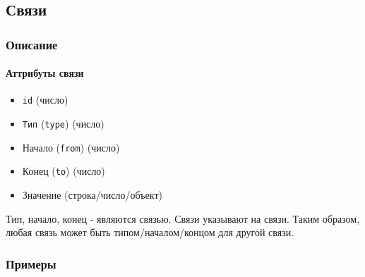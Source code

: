 \subsection{Связи}

\subsubsection{Описание}

\paragraph{Аттрибуты связи}

\begin{itemize}
      \item \texttt{id} (число)
      \item \texttt{Тип} (\texttt{type}) (число)
      \item Начало (\texttt{from}) (число)
      \item Конец (\texttt{to}) (число)
      \item Значение (строка/число/объект)
\end{itemize}

Тип, начало, конец - являются связью. Связи указывают на связи. Таким образом,
любая связь может быть типом/началом/концом для другой связи.

\subsubsection{Примеры}

